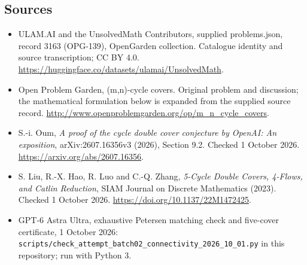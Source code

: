 \documentclass[11pt,a4paper]{article}
\begin{document}
\subsection{Sources}
\begin{itemize}
\item[S1] ULAM.AI and the UnsolvedMath Contributors, supplied problems.json, record 3163 (OPG-139), OpenGarden collection. Catalogue identity and source transcription; CC BY 4.0.
\url{https://huggingface.co/datasets/ulamai/UnsolvedMath}.
\item[S2] Open Problem Garden, (m,n)-cycle covers. Original problem and discussion; the mathematical formulation below is expanded from the supplied source record.
\url{http://www.openproblemgarden.org/op/m_n_cycle_covers}.
\item[S3] S.-i. Oum, \emph{A proof of the cycle double cover conjecture by OpenAI: An exposition}, arXiv:2607.16356v3 (2026), Section 9.2. Checked 1 October 2026.
\url{https://arxiv.org/abs/2607.16356}.
\item[S4] S. Liu, R.-X. Hao, R. Luo and C.-Q. Zhang, \emph{5-Cycle Double Covers, 4-Flows, and Catlin Reduction}, SIAM Journal on Discrete Mathematics (2023). Checked 1 October 2026.
\url{https://doi.org/10.1137/22M1472425}.
\item[S5] GPT-6 Astra Ultra, exhaustive Petersen matching check and five-cover certificate, 1 October 2026: \texttt{scripts/check\_attempt\_batch02\_connectivity\_2026\_10\_01.py} in this repository; run with Python 3.
\end{itemize}
\end{document}
